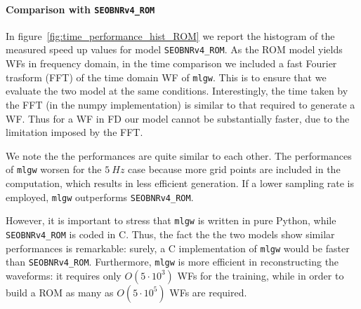 \paragraph{Comparison with \texttt{SEOBNRv4\_ROM}}
In figure~\ref{fig:time_performance_hist_ROM} we report the histogram of the measured speed up values for model \texttt{SEOBNRv4\_ROM}.
As the ROM model yields WFs in frequency domain, in the time comparison we included a fast Fourier trasform (FFT) of the time domain WF of \texttt{mlgw}. This is to ensure that we evaluate the two model at the same conditions.
Interestingly, the time taken by the FFT (in the numpy implementation) is similar to that required to generate a WF. Thus for a WF in FD our model cannot be substantially faster, due to the limitation imposed by the FFT.
\par
We note the the performances are quite similar to each other.
The performances of \texttt{mlgw} worsen for the $\SI{5}{Hz}$ case because more grid points are included in the computation, which results in less efficient generation.
If a lower sampling rate is employed, \texttt{mlgw} outperforms \texttt{SEOBNRv4\_ROM}.
\par
However, it is important to stress that \texttt{mlgw} is written in pure Python, while \texttt{SEOBNRv4\_ROM} is coded in C. Thus, the fact the the two models show similar performances is remarkable: surely, a C implementation of \texttt{mlgw} would be faster than \texttt{SEOBNRv4\_ROM}.
Furthermore, \texttt{mlgw} is more efficient in reconstructing the waveforms: it requires only $O(5\cdot 10^3)$ WFs for the training, while in order to build a ROM as many as $O(5\cdot 10^5)$ WFs are required.
\par
